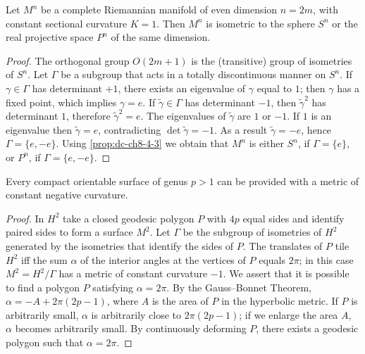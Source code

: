 \begin{proposition}[even-dimensional space forms of $K=1$]
  \label{prop:dc-ch8-4-4}
  \notready
  Let $M^n$ be a complete Riemannian manifold of even dimension $n=2m$, with constant
  sectional curvature $K=1$. Then $M^n$ is isometric to the sphere $S^n$ or the real
  projective space $P^n$ of the same dimension.
\end{proposition}
\begin{proof}
\sketch
  The orthogonal group $O(2m+1)$ is the (transitive) group of isometries of
  $S^n$. Let $\Gamma$ be a subgroup that acts in a totally discontinuous manner on
  $S^n$. If $\gamma\in\Gamma$ has determinant $+1$, there exists an eigenvalue of
  $\gamma$ equal to $1$; then $\gamma$ has a fixed point, which implies $\gamma=e$.
  If $\tilde{\gamma}\in\Gamma$ has determinant $-1$, then $\tilde{\gamma}^2$ has
  determinant $1$, therefore $\tilde{\gamma}^2=e$. The eigenvalues of
  $\tilde{\gamma}$ are $1$ or $-1$. If $1$ is an eigenvalue then $\tilde{\gamma}=e$,
  contradicting $\det\tilde{\gamma}=-1$. As a result $\tilde{\gamma}=-e$, hence
  $\Gamma=\{e,-e\}$. Using \cref{prop:dc-ch8-4-3} we obtain that $M^n$ is either $S^n$, if
  $\Gamma=\{e\}$, or $P^n$, if $\Gamma=\{e,-e\}$.
\end{proof}

\begin{proposition}
  \label{prop:dc-ch8-4-5}
  \notready
  Every compact orientable surface of genus $p>1$ can be provided with a metric of
  constant negative curvature.
\end{proposition}
\begin{proof}
\sketch
  In $H^2$ take a closed geodesic polygon $P$ with $4p$ equal sides and identify
  paired sides to form a surface $M^2$. Let $\Gamma$ be
  the subgroup of isometries of $H^2$ generated by the isometries that identify the
  sides of $P$. The translates of $P$ tile $H^2$ iff
  the sum $\alpha$ of the interior angles at the vertices of $P$ equals $2\pi$; in
  this case $M^2=H^2/\Gamma$ has a metric of constant curvature $-1$. We assert that
  it is possible to find a polygon $P$ satisfying $\alpha=2\pi$. By the Gauss–Bonnet
  Theorem, $\alpha=-A+2\pi(2p-1)$, where $A$ is the area of $P$ in the hyperbolic
  metric. If $P$ is arbitrarily small, $\alpha$ is arbitrarily close to $2\pi(2p-1)$;
  if we enlarge the area $A$, $\alpha$ becomes arbitrarily small. By continuously
  deforming $P$, there exists a geodesic polygon such that $\alpha=2\pi$.

\end{proof}

